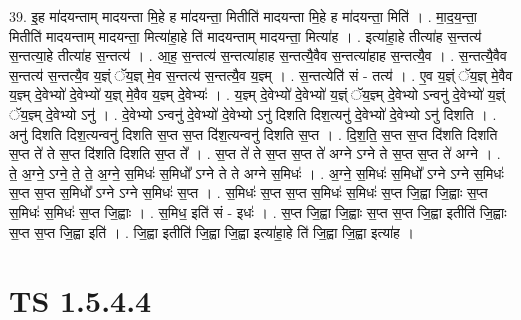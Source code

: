 \documentclass[17pt]{extarticle}
\begin{document}
39. इ॒ह मा॑दयन्ताम् मादयन्ता मि॒हे ह मा॑दयन्ता॒ मितीति॑ मादयन्ता मि॒हे ह मा॑दयन्ता॒ मिति॑ । . मा॒द॒य॒न्ता॒ मितीति॑ मादयन्ताम् मादयन्ता॒ मित्या॑हा॒हे ति॑ मादयन्ताम् मादयन्ता॒ मित्या॑ह । . इत्या॑हा॒हे तीत्या॑ह स॒न्तत्य॑ स॒न्तत्या॒हे तीत्या॑ह स॒न्तत्य॑ । . आ॒ह॒ स॒न्तत्य॑ स॒न्तत्या॑हाह स॒न्तत्यै॒वैव स॒न्तत्या॑हाह स॒न्तत्यै॒व । . स॒न्तत्यै॒वैव स॒न्तत्य॑ स॒न्तत्यै॒व य॒ज्ञ्ं ॅय॒ज्ञ् मे॒व स॒न्तत्य॑ स॒न्तत्यै॒व य॒ज्ञ्म् । . स॒न्तत्येति॑ सं - तत्य॑ । . ए॒व य॒ज्ञ्ं ॅय॒ज्ञ् मे॒वैव य॒ज्ञ्म् दे॒वेभ्यो॑ दे॒वेभ्यो॑ य॒ज्ञ् मे॒वैव य॒ज्ञ्म् दे॒वेभ्यः॑ । . य॒ज्ञ्म् दे॒वेभ्यो॑ दे॒वेभ्यो॑ य॒ज्ञ्ं ॅय॒ज्ञ्म् दे॒वेभ्यो ऽन्वनु॑ दे॒वेभ्यो॑ य॒ज्ञ्ं ॅय॒ज्ञ्म् दे॒वेभ्यो ऽनु॑ । . दे॒वेभ्यो ऽन्वनु॑ दे॒वेभ्यो॑ दे॒वेभ्यो ऽनु॑ दिशति दिश॒त्यनु॑ दे॒वेभ्यो॑ दे॒वेभ्यो ऽनु॑ दिशति । . अनु॑ दिशति दिश॒त्यन्वनु॑ दिशति स॒प्त स॒प्त दि॑श॒त्यन्वनु॑ दिशति स॒प्त । . दि॒श॒ति॒ स॒प्त स॒प्त दि॑शति दिशति स॒प्त ते॑ ते स॒प्त दि॑शति दिशति स॒प्त ते᳚ । . स॒प्त ते॑ ते स॒प्त स॒प्त ते॑ अग्ने ऽग्ने ते स॒प्त स॒प्त ते॑ अग्ने । . ते॒ अ॒ग्ने॒ ऽग्ने॒ ते॒ ते॒ अ॒ग्ने॒ स॒मिधः॑ स॒मिधो᳚ ऽग्ने ते ते अग्ने स॒मिधः॑ । . अ॒ग्ने॒ स॒मिधः॑ स॒मिधो᳚ ऽग्ने ऽग्ने स॒मिधः॑ स॒प्त स॒प्त स॒मिधो᳚ ऽग्ने ऽग्ने स॒मिधः॑ स॒प्त । . स॒मिधः॑ स॒प्त स॒प्त स॒मिधः॑ स॒मिधः॑ स॒प्त जि॒ह्वा जि॒ह्वाः स॒प्त स॒मिधः॑ स॒मिधः॑ स॒प्त जि॒ह्वाः । . स॒मिध॒ इति॑ सं - इधः॑ । . स॒प्त जि॒ह्वा जि॒ह्वाः स॒प्त स॒प्त जि॒ह्वा इतीति॑ जि॒ह्वाः स॒प्त स॒प्त जि॒ह्वा इति॑ । . जि॒ह्वा इतीति॑ जि॒ह्वा जि॒ह्वा इत्या॑हा॒हे ति॑ जि॒ह्वा जि॒ह्वा इत्या॑ह । \newline
\pagebreak
{}
\section*{ TS 1.5.4.4 }
\end{document}
